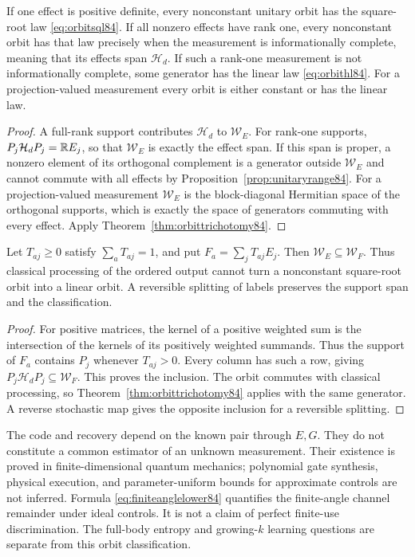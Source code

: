 \begin{corollary}\label{cor:orbitexamples84}
If one effect is positive definite, every nonconstant unitary orbit
has the square-root law \eqref{eq:orbitsql84}.  If all nonzero
effects have rank one, every nonconstant orbit has that law precisely
when the measurement is informationally complete, meaning that its
effects span $\mathcal H_d$.  If such a rank-one measurement is not
informationally complete, some generator has the linear law
\eqref{eq:orbithl84}.  For a projection-valued measurement every
orbit is either constant or has the linear law.
\end{corollary}
\begin{proof}
A full-rank support contributes $\mathcal H_d$ to $\mathcal W_E$.
For rank-one supports, $P_j\mathcal H_dP_j=\mathbb R E_j$, so that
$\mathcal W_E$ is exactly the effect span.  If this span is proper,
a nonzero element of its orthogonal complement is a generator
outside $\mathcal W_E$ and cannot commute with all effects by
Proposition~\ref{prop:unitaryrange84}.  For a projection-valued
measurement $\mathcal W_E$ is the block-diagonal Hermitian space
of the orthogonal supports, which is exactly the space of generators
commuting with every effect.  Apply Theorem~\ref{thm:orbittrichotomy84}.
\end{proof}

\begin{proposition}\label{prop:supportprocessing84}
Let $T_{aj}\ge0$ satisfy $\sum_aT_{aj}=1$, and put
$F_a=\sum_jT_{aj}E_j$.  Then $\mathcal W_E\subseteq\mathcal W_F$.
Thus classical processing of the ordered output cannot turn a
nonconstant square-root orbit into a linear orbit.  A reversible
splitting of labels preserves the support span and the classification.
\end{proposition}
\begin{proof}
For positive matrices, the kernel of a positive weighted sum is the
intersection of the kernels of its positively weighted summands.
Thus the support of $F_a$ contains $P_j$ whenever $T_{aj}>0$.
Every column has such a row, giving
$P_j\mathcal H_dP_j\subseteq\mathcal W_F$.
This proves the inclusion.  The orbit commutes with classical
processing, so Theorem~\ref{thm:orbittrichotomy84} applies with the
same generator.  A reverse stochastic map gives the opposite
inclusion for a reversible splitting.
\end{proof}

\begin{remark}\label{rem:orbitresources84}
The code and recovery depend on the known pair through $E,G$.
They do not constitute a common estimator of an unknown measurement.
Their existence is proved in finite-dimensional quantum mechanics;
polynomial gate synthesis, physical execution, and parameter-uniform
bounds for approximate controls are not inferred.  Formula
\eqref{eq:finiteanglelower84} quantifies the finite-angle channel
remainder under ideal controls.  It is not a claim of perfect
finite-use discrimination.  The full-body entropy and growing-$k$
learning questions are separate from this orbit classification.
\end{remark}
